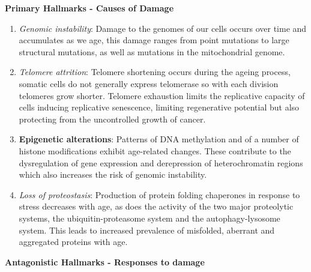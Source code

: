 \documentclass[
]{book}
\begin{document}
\textbf{Primary Hallmarks - Causes of Damage}

\begin{enumerate}
\def\labelenumi{\arabic{enumi}.}
\item
  \emph{Genomic instability}:
  Damage to the genomes of our cells occurs over time and accumulates as we age, this damage ranges from point mutations to large structural mutations, as well as mutations in the mitochondrial genome.
\item
  \emph{Telomere attrition}:
  Telomere shortening occurs during the ageing process, somatic cells do not generally express telomerase so with each division telomeres grow shorter.
  Telomere exhaustion limits the replicative capacity of cells inducing replicative senescence, limiting regenerative potential but also protecting from the uncontrolled growth of cancer.
\item
  \textbf{Epigenetic alterations}:
  Patterns of DNA methylation and of a number of histone modifications exhibit age-related changes. These contribute to the dysregulation of gene expression and derepression of heterochromatin regions which also increases the risk of genomic instability.
\item
  \emph{Loss of proteostasis}:
  Production of protein folding chaperones in response to stress decreases with age, as does the activity of the two major proteolytic systems, the ubiquitin-proteasome system and the autophagy-lysosome system.
  This leads to increased prevalence of misfolded, aberrant and aggregated proteins with age.
\end{enumerate}

\textbf{Antagonistic Hallmarks - Responses to damage}
\end{document}
